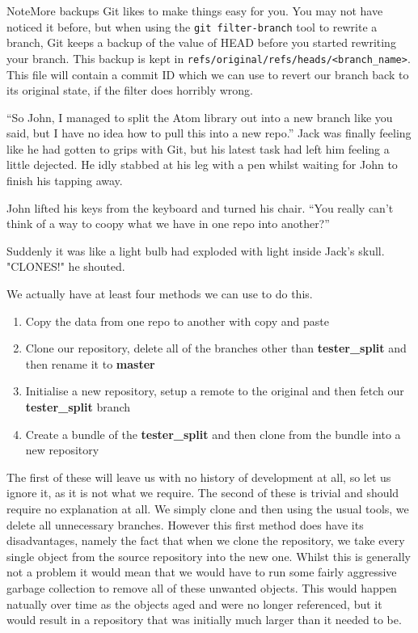 {\begin{callout}{Note}{More backups}
Git likes to make things easy for you.
You may not have noticed it before, but when using the \texttt{git filter-branch} tool to rewrite a branch, Git keeps a backup of the value of HEAD before you started rewriting your branch.
This backup is kept in \texttt{refs/original/refs/heads/<branch\_name>}.
This file will contain a commit ID which we can use to revert our branch back to its original state, if the filter does horribly wrong.
\end{callout}

\begin{trenches}
``So John, I managed to split the Atom library out into a new branch like you said, but I have no idea how to pull this into a new repo.''
Jack was finally feeling like he had gotten to grips with Git, but his latest task had left him feeling a little dejected.
He idly stabbed at his leg with a pen whilst waiting for John to finish his tapping away.

John lifted his keys from the keyboard and turned his chair.
``You really can't think of a way to coopy what we have in one repo into another?''

Suddenly it was like a light bulb had exploded with light inside Jack's skull.  "CLONES!" he shouted.
\end{trenches}

We actually have at least four methods we can use to do this.
\begin{enumerate}
\item Copy the data from one repo to another with copy and paste
\item Clone our repository, delete all of the branches other than \textbf{tester\_split} and then rename it to \textbf{master}
\item Initialise a new repository, setup a remote to the original and then fetch our \textbf{tester\_split} branch
\item Create a bundle of the \textbf{tester\_split} and then clone from the bundle into a new repository
\end{enumerate}

The first of these will leave us with no history of development at all, so let us ignore it, as it is not what we require.
The second of these is trivial and should require no explanation at all.
We simply clone and then using the usual tools, we delete all unnecessary branches.
However this first method does have its disadvantages, namely the fact that when we clone the repository, we take every single object from the source repository into the new one.
Whilst this is generally not a problem it would mean that we would have to run some fairly aggressive garbage collection to remove all of these unwanted objects.
This would happen natually over time as the objects aged and were no longer referenced, but it would result in a repository that was initially much larger than it needed to be.

}
